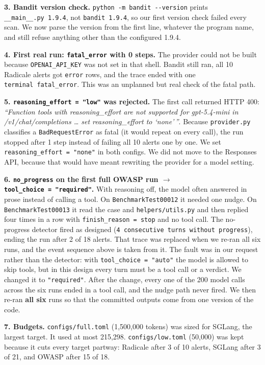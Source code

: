 \documentclass[
  10pt,
]{article}
\newcounter{none} %
\begin{document}
\textbf{3. Bandit version check.}
\texttt{python\ -m\ bandit\ -\/-version} prints
\texttt{\_\_main\_\_.py\ 1.9.4}, not \texttt{bandit\ 1.9.4}, so our
first version check failed every scan. We now parse the version from the
first line, whatever the program name, and still refuse anything other
than the configured 1.9.4.

\textbf{4. First real run: \texttt{fatal\_error} with 0 steps.} The
provider could not be built because \texttt{OPENAI\_API\_KEY} was not
set in that shell. Bandit still ran, all 10 Radicale alerts got
\texttt{error} rows, and the trace ended with one
\texttt{terminal\ fatal\_error}. This was an unplanned but real check of
the fatal path.

\textbf{5. \texttt{reasoning\_effort\ =\ "low"} was rejected.} The first
call returned HTTP 400: \emph{``Function tools with reasoning\_effort
are not supported for gpt-5.4-mini in /v1/chat/completions \ldots{} set
reasoning\_effort to `none'\,''}. Because \texttt{provider.py}
classifies a \texttt{BadRequestError} as fatal (it would repeat on every
call), the run stopped after 1 step instead of failing all 10 alerts one
by one. We set \texttt{reasoning\_effort\ =\ "none"} in both configs. We
did not move to the Responses API, because that would have meant
rewriting the provider for a model setting.

\textbf{6. \texttt{no\_progress} on the first full OWASP run \ensuremath{\rightarrow}
\texttt{tool\_choice\ =\ "required"}.} With reasoning off, the model
often answered in prose instead of calling a tool. On
\texttt{BenchmarkTest00012} it needed one nudge. On
\texttt{BenchmarkTest00013} it read the case and
\texttt{helpers/utils.py} and then replied four times in a row with
\texttt{finish\_reason\ =\ stop} and no tool call. The no-progress
detector fired as designed
(\texttt{4\ consecutive\ turns\ without\ progress}), ending the run
after 2 of 18 alerts. That trace was replaced when we re-ran all six
runs, and the event sequence above is taken from it. The fault was in
our request rather than the detector: with
\texttt{tool\_choice\ =\ "auto"} the model is allowed to skip tools, but
in this design every turn must be a tool call or a verdict. We changed
it to \texttt{"required"}. After the change, every one of the 200 model
calls across the six runs ended in a tool call, and the nudge path never
fired. We then re-ran \textbf{all six} runs so that the committed
outputs come from one version of the code.

\textbf{7. Budgets.} \texttt{configs/full.toml} (1,500,000 tokens) was
sized for SGLang, the largest target. It used at most 215,298.
\texttt{configs/low.toml} (50,000) was kept because it cuts every target
partway: Radicale after 3 of 10 alerts, SGLang after 3 of 21, and OWASP
after 15 of 18.
\end{document}
